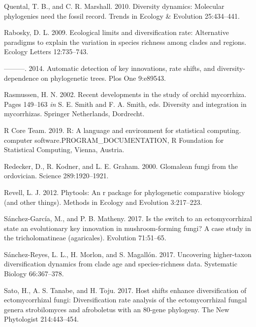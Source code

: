 \documentclass[12pt,]{article}
\begin{document}
\leavevmode\hypertarget{ref-quental_2010}{}%
Quental, T. B., and C. R. Marshall. 2010. Diversity dynamics: Molecular
phylogenies need the fossil record. Trends in Ecology \& Evolution
25:434--441.

\leavevmode\hypertarget{ref-rabosky_2009}{}%
Rabosky, D. L. 2009. Ecological limits and diversification rate:
Alternative paradigms to explain the variation in species richness among
clades and regions. Ecology Letters 12:735--743.

\leavevmode\hypertarget{ref-rabosky_2014}{}%
---------. 2014. Automatic detection of key innovations, rate shifts,
and diversity-dependence on phylogenetic trees. Plos One 9:e89543.

\leavevmode\hypertarget{ref-rasmussen_2002}{}%
Rasmussen, H. N. 2002. Recent developments in the study of orchid
mycorrhiza. Pages 149--163 \emph{in} S. E. Smith and F. A. Smith, eds.
Diversity and integration in mycorrhizas. Springer Netherlands,
Dordrecht.

\leavevmode\hypertarget{ref-rcoreteam_software_2019}{}%
R Core Team. 2019. R: A language and environment for statistical
computing. computer software.PROGRAM\_DOCUMENTATION, R Foundation for
Statistical Computing, Vienna, Austria.

\leavevmode\hypertarget{ref-redecker_2000}{}%
Redecker, D., R. Kodner, and L. E. Graham. 2000. Glomalean fungi from
the ordovician. Science 289:1920--1921.

\leavevmode\hypertarget{ref-revell_2012}{}%
Revell, L. J. 2012. Phytools: An r package for phylogenetic comparative
biology (and other things). Methods in Ecology and Evolution 3:217--223.

\leavevmode\hypertarget{ref-snchezgarca_2017}{}%
Sánchez-García, M., and P. B. Matheny. 2017. Is the switch to an
ectomycorrhizal state an evolutionary key innovation in mushroom-forming
fungi? A case study in the tricholomatineae (agaricales). Evolution
71:51--65.

\leavevmode\hypertarget{ref-snchezreyes_2017}{}%
Sánchez-Reyes, L. L., H. Morlon, and S. Magallón. 2017. Uncovering
higher-taxon diversification dynamics from clade age and
species-richness data. Systematic Biology 66:367--378.

\leavevmode\hypertarget{ref-sato_2017}{}%
Sato, H., A. S. Tanabe, and H. Toju. 2017. Host shifts enhance
diversification of ectomycorrhizal fungi: Diversification rate analysis
of the ectomycorrhizal fungal genera strobilomyces and afroboletus with
an 80-gene phylogeny. The New Phytologist 214:443--454.
\end{document}
